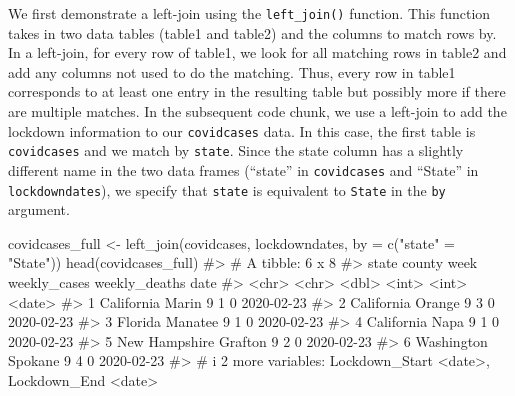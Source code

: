 \documentclass[
  letterpaper,
]{latex/krantz}
\makeatletter
\newenvironment{Shaded}{\begin{snugshade}}{\end{snugshade}}
\newcommand{\AttributeTok}[1]{\textcolor[rgb]{0.40,0.45,0.13}{#1}}
\newcommand{\CommentTok}[1]{\textcolor[rgb]{0.37,0.37,0.37}{#1}}
\newcommand{\FunctionTok}[1]{\textcolor[rgb]{0.28,0.35,0.67}{#1}}
\newcommand{\NormalTok}[1]{\textcolor[rgb]{0.00,0.23,0.31}{#1}}
\newcommand{\OtherTok}[1]{\textcolor[rgb]{0.00,0.23,0.31}{#1}}
\newcommand{\StringTok}[1]{\textcolor[rgb]{0.13,0.47,0.30}{#1}}
\newenvironment{kframe}{%
\medskip{}
\setlength{\fboxsep}{.8em}
 \def\at@end@of@kframe{}%
 \ifinner\ifhmode%
  \def\at@end@of@kframe{\end{minipage}}%
  \begin{minipage}{\columnwidth}%
 \fi\fi%
 \def\FrameCommand##1{\hskip\@totalleftmargin \hskip-\fboxsep
 \colorbox{shadecolor}{##1}\hskip-\fboxsep
     \hskip-\linewidth \hskip-\@totalleftmargin \hskip\columnwidth}%
 \MakeFramed {\advance\hsize-\width
   \@totalleftmargin\z@ \linewidth\hsize
   \@setminipage}}%
 {\par\unskip\endMakeFramed%
 \at@end@of@kframe}
\renewenvironment{Shaded}{\begin{kframe}}{\end{kframe}}
\makeatother
\begin{document}
We first demonstrate a left-join using the
\texttt{left\_join()}
function. This function takes in two data tables (table1 and table2) and
the columns to match rows by. In a left-join, for every row of table1,
we look for all matching rows in table2 and add any columns not used to
do the matching. Thus, every row in table1 corresponds to at least one
entry in the resulting table but possibly more if there are multiple
matches. In the subsequent code chunk, we use a left-join to add the
lockdown information to our \texttt{covidcases} data. In this case, the
first table is \texttt{covidcases} and we match by \texttt{state}. Since
the state column has a slightly different name in the two data frames
(``state'' in \texttt{covidcases} and ``State'' in
\texttt{lockdowndates}), we specify that \texttt{state} is equivalent to
\texttt{State} in the \texttt{by} argument.

\begin{Shaded}
\begin{Highlighting}[]
\NormalTok{covidcases\_full }\OtherTok{\textless{}{-}} \FunctionTok{left\_join}\NormalTok{(covidcases, lockdowndates, }
                             \AttributeTok{by =} \FunctionTok{c}\NormalTok{(}\StringTok{"state"} \OtherTok{=} \StringTok{"State"}\NormalTok{))}
\FunctionTok{head}\NormalTok{(covidcases\_full)}
\CommentTok{\#\textgreater{} \# A tibble: 6 x 8}
\CommentTok{\#\textgreater{}   state         county   week weekly\_cases weekly\_deaths date      }
\CommentTok{\#\textgreater{}   \textless{}chr\textgreater{}         \textless{}chr\textgreater{}   \textless{}dbl\textgreater{}        \textless{}int\textgreater{}         \textless{}int\textgreater{} \textless{}date\textgreater{}    }
\CommentTok{\#\textgreater{} 1 California    Marin       9            1             0 2020{-}02{-}23}
\CommentTok{\#\textgreater{} 2 California    Orange      9            3             0 2020{-}02{-}23}
\CommentTok{\#\textgreater{} 3 Florida       Manatee     9            1             0 2020{-}02{-}23}
\CommentTok{\#\textgreater{} 4 California    Napa        9            1             0 2020{-}02{-}23}
\CommentTok{\#\textgreater{} 5 New Hampshire Grafton     9            2             0 2020{-}02{-}23}
\CommentTok{\#\textgreater{} 6 Washington    Spokane     9            4             0 2020{-}02{-}23}
\CommentTok{\#\textgreater{} \# i 2 more variables: Lockdown\_Start \textless{}date\textgreater{}, Lockdown\_End \textless{}date\textgreater{}}
\end{Highlighting}
\end{Shaded}
\end{document}
